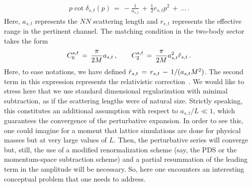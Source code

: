 \documentclass[12pt,prd,tightenlines,nofootinbib]{revtex4-2}
\begin{document}
\begin{align}
  p\cot{\delta_{s,t}(p)}\, =\, -\frac{1}{a_{s,t}} \, +\, \frac{1}{2}r_{s,t}p^{2}\,+\, \dotsc\,.
\end{align}
Here, $a_{s,t}$ represents the $NN$ scattering length and $r_{s,t}$ represents the effective range in the pertinent channel.
The matching condition in the two-body sector takes the form
\begin{align}
    C_{0}^{s,t}\, =\, \frac{\pi}{2M}a_{s,t}\,,\quad\quad
  C_{2}^{s,t}\, =\, \frac{\pi}{2M}a^{2}_{s,t}\Hat{r}_{s,t}\,.
\end{align}
Here, to ease notations, we have defined  $\Hat{r}_{s,t}\, =\, r_{s,t}\, -\,
1/(a_{s,t}M^{2})$. The second term in this expression represents the relativistic
correction~\cite{Romero-Lopez:2020rdq}. We would like to stress here that we use
standard dimensional regularization with minimal subtraction, as if the
scattering lengths were of natural size. Strictly speaking, this constitutes an additional
assumption with respect to $a_{s,t}/L\ll 1$, which guarantees the convergence of the
perturbative expansion. In order to see this, one could imagine for a moment that lattice
simulations are done for physical masses but at very large values of $L$. Then, the
perturbative series will converge but, still, the use of a modified renormalization scheme
(say, the PDS or the momentum-space subtraction scheme)
and a partial resummation of the leading term in the amplitude will be necessary. So,
here one encounters an interesting conceptual problem that one needs to address.
\end{document}

